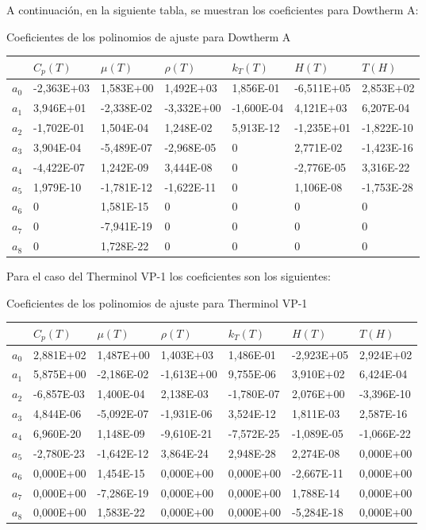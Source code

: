 A continuación, en la siguiente tabla, se muestran los coeficientes para
Dowtherm A:

Coeficientes de los polinomios de ajuste para Dowtherm A

\begin{longtable}[]{@{}lllllll@{}}
\toprule
& \(C_p(T)\) & \(\mu(T)\) & \(\rho(T)\) & \(k_T(T)\) & \(H(T)\) &
\(T(H)\)\tabularnewline
\midrule
\endhead
\(a_0\) & -2,363E+03 & 1,583E+00 & 1,492E+03 & 1,856E-01 & -6,511E+05 &
2,853E+02\tabularnewline
\(a_1\) & 3,946E+01 & -2,338E-02 & -3,332E+00 & -1,600E-04 & 4,121E+03 &
6,207E-04\tabularnewline
\(a_2\) & -1,702E-01 & 1,504E-04 & 1,248E-02 & 5,913E-12 & -1,235E+01 &
-1,822E-10\tabularnewline
\(a_3\) & 3,904E-04 & -5,489E-07 & -2,968E-05 & 0 & 2,771E-02 &
-1,423E-16\tabularnewline
\(a_4\) & -4,422E-07 & 1,242E-09 & 3,444E-08 & 0 & -2,776E-05 &
3,316E-22\tabularnewline
\(a_5\) & 1,979E-10 & -1,781E-12 & -1,622E-11 & 0 & 1,106E-08 &
-1,753E-28\tabularnewline
\(a_6\) & 0 & 1,581E-15 & 0 & 0 & 0 & 0\tabularnewline
\(a_7\) & 0 & -7,941E-19 & 0 & 0 & 0 & 0\tabularnewline
\(a_8\) & 0 & 1,728E-22 & 0 & 0 & 0 & 0\tabularnewline
\bottomrule
\end{longtable}

Para el caso del Therminol VP-1 los coeficientes son los siguientes:

Coeficientes de los polinomios de ajuste para Therminol VP-1

\begin{longtable}[]{@{}lllllll@{}}
\toprule
& \(C_p(T)\) & \(\mu(T)\) & \(\rho(T)\) & \(k_T(T)\) & \(H(T)\) &
\(T(H)\)\tabularnewline
\midrule
\endhead
\(a_0\) & 2,881E+02 & 1,487E+00 & 1,403E+03 & 1,486E-01 & -2,923E+05 &
2,924E+02\tabularnewline
\(a_1\) & 5,875E+00 & -2,186E-02 & -1,613E+00 & 9,755E-06 & 3,910E+02 &
6,424E-04\tabularnewline
\(a_2\) & -6,857E-03 & 1,400E-04 & 2,138E-03 & -1,780E-07 & 2,076E+00 &
-3,396E-10\tabularnewline
\(a_3\) & 4,844E-06 & -5,092E-07 & -1,931E-06 & 3,524E-12 & 1,811E-03 &
2,587E-16\tabularnewline
\(a_4\) & 6,960E-20 & 1,148E-09 & -9,610E-21 & -7,572E-25 & -1,089E-05 &
-1,066E-22\tabularnewline
\(a_5\) & -2,780E-23 & -1,642E-12 & 3,864E-24 & 2,948E-28 & 2,274E-08 &
0,000E+00\tabularnewline
\(a_6\) & 0,000E+00 & 1,454E-15 & 0,000E+00 & 0,000E+00 & -2,667E-11 &
0,000E+00\tabularnewline
\(a_7\) & 0,000E+00 & -7,286E-19 & 0,000E+00 & 0,000E+00 & 1,788E-14 &
0,000E+00\tabularnewline
\(a_8\) & 0,000E+00 & 1,583E-22 & 0,000E+00 & 0,000E+00 & -5,284E-18 &
0,000E+00\tabularnewline
\bottomrule
\end{longtable}

